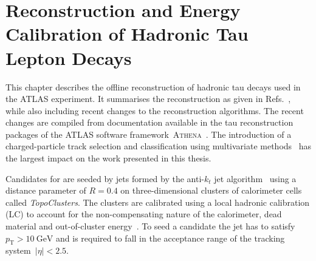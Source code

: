 \chapter{Reconstruction and Energy Calibration of Hadronic Tau Lepton Decays}
\label{sec:reconstruction}

%
%
This chapter describes the offline reconstruction of hadronic tau decays used in
the ATLAS experiment. It summarises the reconstruction as given in Refs.\
\cite{atlas:taurec:run1, atlas:taurec:run2}, while also including recent changes
to the reconstruction algorithms. The recent changes are compiled from
documentation available in the tau reconstruction packages of the ATLAS software
framework~\textsc{Athena}~\cite{athena}. The introduction of a charged-particle
track selection and classification using multivariate methods~\cite{duschinger}
has the largest impact on the work presented in this thesis.

Candidates for \tauhadvis are seeded by jets formed by the anti-$k_t$ jet
algorithm~\cite{antikt} using a distance parameter of $R = 0.4$ on
three-dimensional clusters of calorimeter cells called \emph{TopoClusters}. The
clusters are calibrated using a local hadronic calibration (LC) to account for
the non-compensating nature of the calorimeter, dead material and out-of-cluster
energy~\cite{local_hadronic_calib}. To seed a \tauhadvis candidate the jet has
to satisfy~$p_\text{T} > \SI{10}{\GeV}$ and is required to fall in the
acceptance range of the tracking system~$|\eta| < \num{2.5}$.

